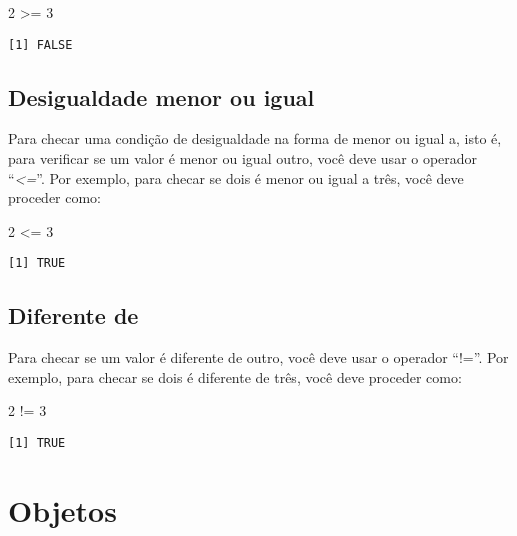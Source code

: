 \documentclass[
  letterpaper,
  DIV=11,
  numbers=noendperiod]{scrreprt}
\newenvironment{Shaded}{\begin{snugshade}}{\end{snugshade}}
\newcommand{\DecValTok}[1]{\textcolor[rgb]{0.68,0.00,0.00}{#1}}
\newcommand{\SpecialCharTok}[1]{\textcolor[rgb]{0.37,0.37,0.37}{#1}}
\begin{document}
\begin{Shaded}
\begin{Highlighting}[]
\DecValTok{2} \SpecialCharTok{\textgreater{}=} \DecValTok{3}
\end{Highlighting}
\end{Shaded}

\begin{verbatim}
[1] FALSE
\end{verbatim}

\subsection{Desigualdade menor ou
igual}\label{desigualdade-menor-ou-igual}

Para checar uma condição de desigualdade na forma de menor ou igual a,
isto é, para verificar se um valor é menor ou igual outro, você deve
usar o operador ``\emph{\textless=}''. Por exemplo, para checar se dois
é menor ou igual a três, você deve proceder como:

\begin{Shaded}
\begin{Highlighting}[]
\DecValTok{2} \SpecialCharTok{\textless{}=} \DecValTok{3}
\end{Highlighting}
\end{Shaded}

\begin{verbatim}
[1] TRUE
\end{verbatim}

\subsection{Diferente de}\label{diferente-de}

Para checar se um valor é diferente de outro, você deve usar o operador
``!=''. Por exemplo, para checar se dois é diferente de três, você deve
proceder como:

\begin{Shaded}
\begin{Highlighting}[]
\DecValTok{2} \SpecialCharTok{!=} \DecValTok{3}
\end{Highlighting}
\end{Shaded}

\begin{verbatim}
[1] TRUE
\end{verbatim}

\section{Objetos}\label{objetos}
\end{document}
